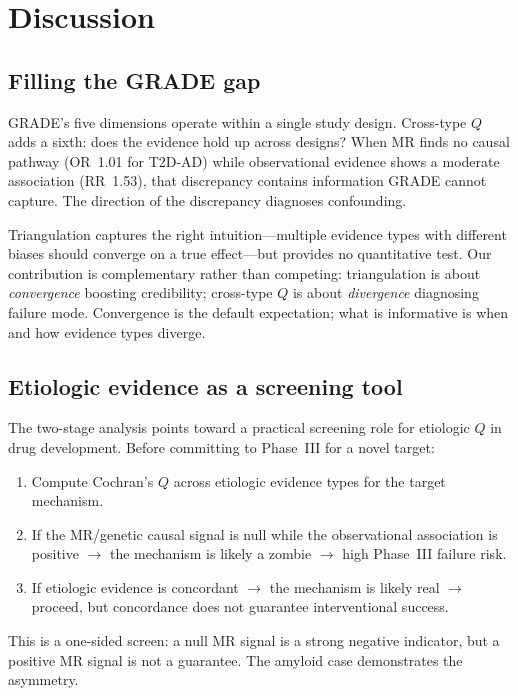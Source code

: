 \documentclass[11pt]{article}
\begin{document}
\section{Discussion}

\subsection{Filling the GRADE gap}

GRADE's five dimensions operate within a single study design. Cross-type $Q$ adds a sixth: does the evidence hold up across designs? When MR finds no causal pathway (OR~1.01 for T2D-AD) while observational evidence shows a moderate association (RR~1.53), that discrepancy contains information GRADE cannot capture. The direction of the discrepancy diagnoses confounding.

Triangulation \citep{lawlor2016} captures the right intuition---multiple evidence types with different biases should converge on a true effect---but provides no quantitative test. Our contribution is complementary rather than competing: triangulation is about \emph{convergence} boosting credibility; cross-type $Q$ is about \emph{divergence} diagnosing failure mode. Convergence is the default expectation; what is informative is when and how evidence types diverge.

\subsection{Etiologic evidence as a screening tool}

The two-stage analysis points toward a practical screening role for etiologic $Q$ in drug development. Before committing to Phase~III for a novel target:

\begin{enumerate}
\item Compute Cochran's $Q$ across etiologic evidence types for the target mechanism.
\item If the MR/genetic causal signal is null while the observational association is positive $\to$ the mechanism is likely a zombie $\to$ high Phase~III failure risk.
\item If etiologic evidence is concordant $\to$ the mechanism is likely real $\to$ proceed, but concordance does not guarantee interventional success.
\end{enumerate}

This is a one-sided screen: a null MR signal is a strong negative indicator, but a positive MR signal is not a guarantee. The amyloid case demonstrates the asymmetry.
\end{document}
